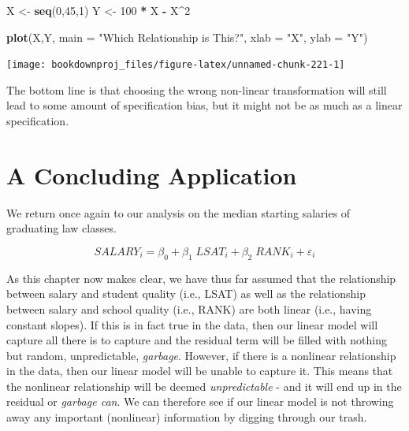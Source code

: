\documentclass[
]{book}
\newenvironment{Shaded}{\begin{snugshade}}{\end{snugshade}}
\newcommand{\AttributeTok}[1]{\textcolor[rgb]{0.13,0.29,0.53}{#1}}
\newcommand{\DecValTok}[1]{\textcolor[rgb]{0.00,0.00,0.81}{#1}}
\newcommand{\FunctionTok}[1]{\textcolor[rgb]{0.13,0.29,0.53}{\textbf{#1}}}
\newcommand{\NormalTok}[1]{#1}
\newcommand{\OtherTok}[1]{\textcolor[rgb]{0.56,0.35,0.01}{#1}}
\newcommand{\SpecialCharTok}[1]{\textcolor[rgb]{0.81,0.36,0.00}{\textbf{#1}}}
\newcommand{\StringTok}[1]{\textcolor[rgb]{0.31,0.60,0.02}{#1}}
\begin{document}
\begin{Shaded}
\begin{Highlighting}[]
\NormalTok{X }\OtherTok{\textless{}{-}} \FunctionTok{seq}\NormalTok{(}\DecValTok{0}\NormalTok{,}\DecValTok{45}\NormalTok{,}\DecValTok{1}\NormalTok{)}
\NormalTok{Y }\OtherTok{\textless{}{-}} \DecValTok{100} \SpecialCharTok{*}\NormalTok{ X }\SpecialCharTok{{-}}\NormalTok{ X}\SpecialCharTok{\^{}}\DecValTok{2}

\FunctionTok{plot}\NormalTok{(X,Y,}
     \AttributeTok{main =} \StringTok{"Which Relationship is This?"}\NormalTok{,}
     \AttributeTok{xlab =} \StringTok{"X"}\NormalTok{,}
     \AttributeTok{ylab =} \StringTok{"Y"}\NormalTok{)}
\end{Highlighting}
\end{Shaded}

\begin{center}\texttt{[image: bookdownproj\_files/figure-latex/unnamed-chunk-221-1]} \end{center}

The bottom line is that choosing the wrong non-linear transformation will still lead to some amount of specification bias, but it might not be as much as a linear specification.

\section{A Concluding Application}\label{a-concluding-application-4}

We return once again to our analysis on the median starting salaries of graduating law classes.

\[SALARY_i = \beta_0 + \beta_1 \; LSAT_i + \beta_2 \; RANK_i + \varepsilon_i\]

As this chapter now makes clear, we have thus far assumed that the relationship between salary and student quality (i.e., LSAT) as well as the relationship between salary and school quality (i.e., RANK) are both linear (i.e., having constant slopes). If this is in fact true in the data, then our linear model will capture all there is to capture and the residual term will be filled with nothing but random, unpredictable, \emph{garbage}. However, if there is a nonlinear relationship in the data, then our linear model will be unable to capture it. This means that the nonlinear relationship will be deemed \emph{unpredictable} - and it will end up in the residual or \emph{garbage can}. We can therefore see if our linear model is not throwing away any important (nonlinear) information by digging through our trash.
\end{document}
